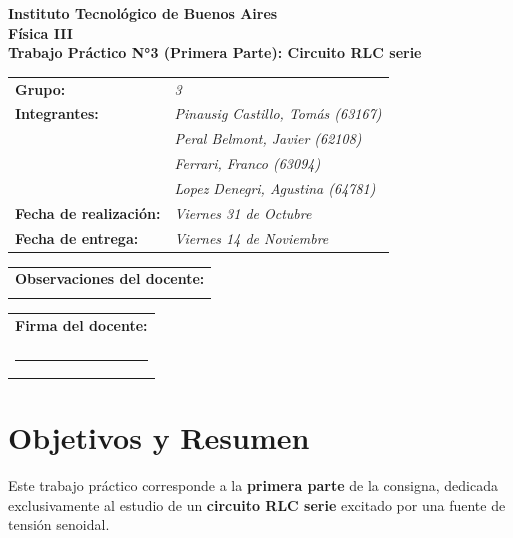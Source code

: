 \documentclass[a4paper,12pt]{article}
\begin{document}
\begin{titlepage}
    \centering
    \vspace*{2cm}
    \textbf{\Large Instituto Tecnológico de Buenos Aires} \\
    \vspace{0.5cm}
    \textbf{\large Física III} \\
    \vspace{1cm}
    \textbf{\LARGE Trabajo Práctico N°3 (Primera Parte): Circuito RLC serie} \\
    \vspace{1.5cm}
    \begin{tabular}{ll}
        \textbf{Grupo:} & \textit{3} \\
        \textbf{Integrantes:} & \textit{Pinausig Castillo, Tomás (63167)} \\
                              & \textit{Peral Belmont, Javier (62108)} \\
                              & \textit{Ferrari, Franco (63094)} \\
                              & \textit{Lopez Denegri, Agustina (64781)} \\
        \textbf{Fecha de realización:} & \textit{Viernes 31 de Octubre} \\
        \textbf{Fecha de entrega:} & \textit{Viernes 14 de Noviembre} \\
    \end{tabular}
    \vspace{2cm}
    \begin{tabular}{|p{12cm}|}
        \hline
        \textbf{Observaciones del docente:} \\
        \vspace{5cm} \\
        \hline
    \end{tabular}
    \vspace{1cm}
    \begin{tabular}{p{6cm}}
        \textbf{Firma del docente:} \\
        \vspace{1cm} \\
        \hrule
    \end{tabular}
\end{titlepage}

\section{Objetivos y Resumen}
Este trabajo práctico corresponde a la \textbf{primera parte} de la consigna, dedicada exclusivamente al estudio de un \textbf{circuito RLC serie} excitado por una fuente de tensión senoidal.
\end{document}
